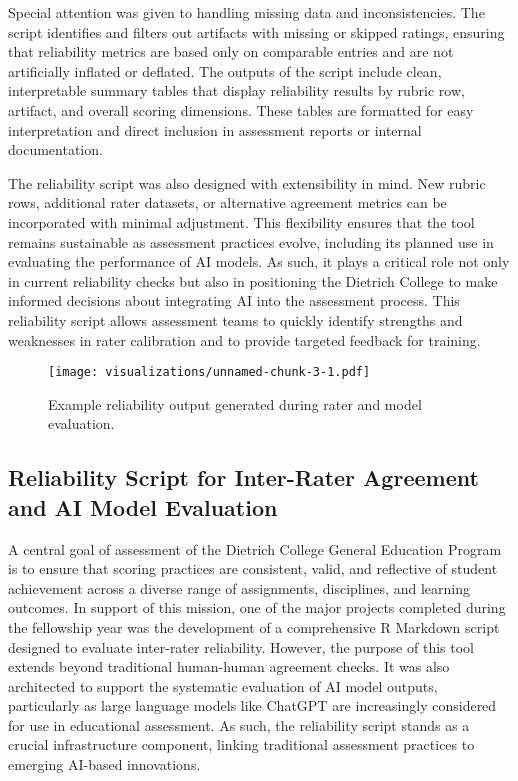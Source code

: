 \documentclass[12pt]{article}%
\begin{document}
Special attention was given to handling missing data and inconsistencies. The script identifies and filters out artifacts with missing or skipped ratings, ensuring that reliability metrics are based only on comparable entries and are not artificially inflated or deflated. The outputs of the script include clean, interpretable summary tables that display reliability results by rubric row, artifact, and overall scoring dimensions. These tables are formatted for easy interpretation and direct inclusion in assessment reports or internal documentation.

The reliability script was also designed with extensibility in mind. New rubric rows, additional rater datasets, or alternative agreement metrics can be incorporated with minimal adjustment. This flexibility ensures that the tool remains sustainable as assessment practices evolve, including its planned use in evaluating the performance of AI models. As such, it plays a critical role not only in current reliability checks but also in positioning the Dietrich College to make informed decisions about integrating AI into the assessment process.
This reliability script allows assessment teams to quickly identify strengths and weaknesses in rater calibration and to provide targeted feedback for training.

\begin{figure}[h]
    \centering
    \texttt{[image: visualizations/unnamed-chunk-3-1.pdf]}
    \caption{Example reliability output generated during rater and model evaluation.}
    \label{fig:reliability_output}
\end{figure}

\subsection*{Reliability Script for Inter-Rater Agreement and AI Model Evaluation}

A central goal of assessment of the Dietrich College General Education Program is to ensure that scoring practices are consistent, valid, and reflective of student achievement across a diverse range of assignments, disciplines, and learning outcomes. In support of this mission, one of the major projects completed during the fellowship year was the development of a comprehensive R Markdown script designed to evaluate inter-rater reliability. However, the purpose of this tool extends beyond traditional human-human agreement checks. It was also architected to support the systematic evaluation of AI model outputs, particularly as large language models like ChatGPT are increasingly considered for use in educational assessment. As such, the reliability script stands as a crucial infrastructure component, linking traditional assessment practices to emerging AI-based innovations.
\end{document}
